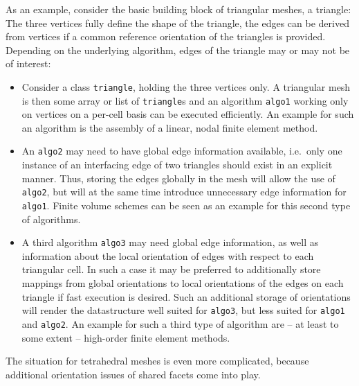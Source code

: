 As an example, consider the basic building block of triangular meshes, a triangle:
The three vertices fully define the shape of the triangle, the edges can be derived from vertices if a common reference orientation of the triangles is provided.
Depending on the underlying algorithm, edges of the triangle may or may not be of interest:
\begin{itemize}
 \item Consider a class \lstinline|triangle|, holding the three vertices only.
       A triangular mesh is then some array or list of \lstinline|triangle|s and an algorithm \texttt{algo1} working only on vertices on a per-cell basis can be executed efficiently.
       An example for such an algorithm is the assembly of a linear, nodal finite element method.

 \item An \texttt{algo2} may need to have global edge information available, i.e.~only one instance of an interfacing edge of two triangles should exist in an explicit manner.
       Thus, storing the edges globally in the mesh will allow the use of \texttt{algo2}, but will at the same time introduce unnecessary edge information for \texttt{algo1}.
       Finite volume schemes can be seen as an example for this second type of algorithms.

 \item A third algorithm \texttt{algo3} may need global edge information, as well as information about the local orientation of edges with respect to each triangular cell.
      In such a case it may be preferred to additionally store mappings from global orientations to local orientations of the edges on each triangle if fast execution is desired.
      Such an additional storage of orientations will render the datastructure well suited for \texttt{algo3}, but less suited for \texttt{algo1} and \texttt{algo2}.
      An example for such a third type of algorithm are -- at least to some extent -- high-order finite element methods.
\end{itemize}
The situation for tetrahedral meshes is even more complicated, because additional orientation issues of shared facets come into play.

